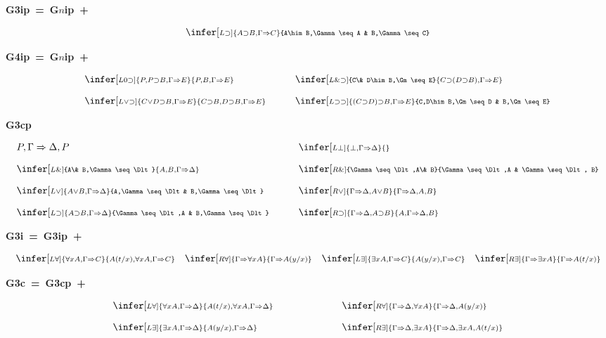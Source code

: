
\centerline{\mbox{{\bf G3ip = G$n$ip +}}}
\[
\infer[\scriptstyle L\him]{A\him B,\Gamma\seq C}{A\him B,\Gamma\seq A & B,\Gamma\seq C}
\]

\centerline{\mbox{{\bf G4ip = G$n$ip + }}}
\[
\begin{array}{ll}
\qquad \infer[\scriptstyle L0\him]{P,P\him B,\Gm\seq E}{P,B,\Gm\seq E}
\qquad
&
\infer[\scriptstyle L\&\him]{C\& D\him B,\Gm\seq E}{C\him(D\him B),\Gm\seq E}
\\*[10pt]
\qquad \infer[\scriptstyle L\lor\him]{C\lor D\him B,\Gm\seq E}{C\him B, D\him B,\Gm\seq E}  
\qquad
&
\infer[\scriptstyle L\him\him]{(C\him D)\him B,\Gm\seq E}{C,D\him B,\Gm\seq D
& B,\Gm\seq E}
\end{array}
\]

\centerline{\mbox{{\bf G3cp}}}
\[
\begin{array}{ll}
P,\Gamma\seq \Dlt,P 
\qquad\qquad &
\infer[\scriptstyle L\bot]{\perp,\Gamma\seq \Dlt}{}
\\*[10pt]
\infer[\scriptstyle L\&]{A\& B,\Gamma\seq \Dlt}{A,B,\Gamma\seq \Dlt}
\qquad\qquad
&\infer[\scriptstyle R\&]{\Gamma\seq \Dlt,A\& B}{\Gamma\seq \Dlt,A & \Gamma\seq\Dlt, B}\\*[10pt]
\infer[\scriptstyle L\vee]{A\vee B,\Gamma\seq \Dlt}{A,\Gamma\seq \Dlt & B,\Gamma\seq \Dlt}
\qquad
&\infer[\scriptstyle R\vee]{\Gamma\seq \Dlt,A\vee B}{\Gamma\seq \Dlt,A,B} 
\\*[10pt]
\infer[\scriptstyle L\him]{A\him B,\Gamma\seq \Dlt}{\Gamma\seq \Dlt,A & B,\Gamma\seq \Dlt}
\qquad
&\infer[\scriptstyle R\him]{\Gamma\seq \Dlt,A\him B}{A,\Gamma\seq \Dlt,B } 
\end{array}
\]

\centerline{\mbox{{\bf G3i = G3ip +}}}
\[
\begin{array}{llll}
\infer[\scriptstyle L\forall]{\forall xA, \Gm \seq C}
                             {A(t/x),\forall xA, \Gm \seq C}
& \infer[\scriptstyle R\forall]{\Gamma\seq \forall xA}{\Gamma\seq A(y/x)} 
&
\infer[\scriptstyle L\exists]{\exists xA,\Gamma\seq C}{A(y/x),\Gamma\seq C}

& \infer[\scriptstyle R\exists]{\Gamma\seq \exists xA}{\Gamma\seq A(t/x)}
\end{array}
\]

\centerline{\mbox{{\bf G3c = G3cp +}}}
\[
\begin{array}{ll}
\infer[\scriptstyle L\forall]{\forall xA, \Gm \seq \Dlt}
                             {A(t/x),\forall xA,\Gm \seq \Dlt}
\qquad\qquad \qquad
& \infer[\scriptstyle R\forall]{\Gamma\seq \Dlt , \forall xA}{\Gamma\seq \Dlt,A(y/x)} 
\\*[10pt]
\infer[\scriptstyle L\exists]{\exists xA,\Gamma\seq \Dlt}{A(y/x),\Gamma\seq \Dlt}
\qquad \qquad \qquad
& \infer[\scriptstyle R\exists]{\Gamma\seq \Dlt,\exists xA}{\Gamma\seq \Dlt,\exists xA,A(t/x)}
\end{array}
\]



